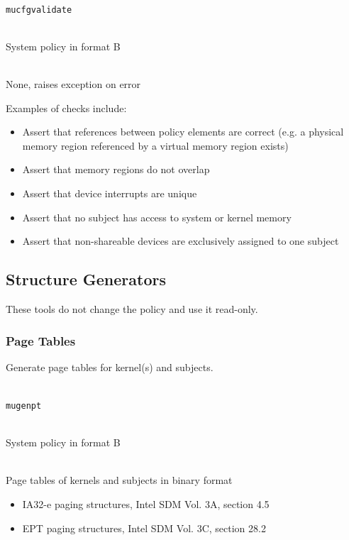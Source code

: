 \documentclass[a4paper,twoside,titlepage]{article}
\begin{document}
\begin{description} \itemsep1pt \parskip0pt
	\item[Name] \hfill \\
		\texttt{mucfgvalidate}
	\item[Input] \hfill \\
		System policy in format B
	\item[Output] \hfill \\
		None, raises exception on error
\end{description}

Examples of checks include:

\begin{itemize}
	\item Assert that references between policy elements are correct (e.g. a
		physical memory	region referenced by a virtual memory region exists)
	\item Assert that memory regions do not overlap
	\item Assert that device interrupts are unique
	\item Assert that no subject has access to system or kernel memory
	\item Assert that non-shareable devices are exclusively assigned to one
		subject
\end{itemize}

\subsection{Structure Generators}
\label{sec:tools-gen}
These tools do not change the policy and use it read-only.

\subsubsection{Page Tables}
Generate page tables for kernel(s) and subjects.

\begin{description} \itemsep1pt \parskip0pt
	\item[Name] \hfill \\
		\texttt{mugenpt}
	\item[Input] \hfill \\
		System policy in format B
	\item[Output] \hfill \\
		Page tables of kernels and subjects in binary format
	\item[Output format] \hfill
		\begin{itemize}
			\item IA32-e paging structures, Intel SDM Vol. 3A, section 4.5
			\item EPT paging structures, Intel SDM Vol. 3C, section 28.2
		\end{itemize}
\end{description}
\end{document}
